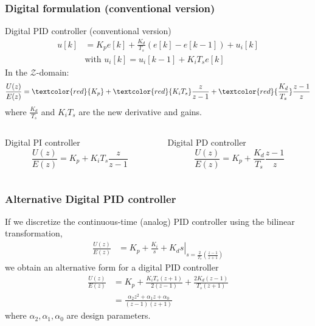 \begin{frame}
	\frametitle{Digital formulation (conventional version)}
	\vspace{-1em}
	\small{
	\begin{block}{Digital PID controller (conventional version)}
			\vspace{-1em}
			\begin{align*}
			u[k] &= K_p e[k] + \frac{K_d}{T_s}(e[k] - e[k-1])+u_i[k] \\
			&\text{with } u_i[k] = u_i[k-1] + K_i T_s e[k]
			\end{align*}	
			In the $\mathcal{Z}$-domain:
			\begin{equation*}
			\frac{U(z)}{E(z)} = \textcolor{red}{K_p}  + \textcolor{red}{K_i T_s}\frac{z}{z-1} + \textcolor{red}{\frac{K_d}{T_s}}\frac{z-1}{z}
			\end{equation*}
			where $\frac{K_d}{T_s}$ and $K_iT_s$  are the new derivative and gains.
	\end{block}
	\begin{columns}
		\begin{column}{0.5 \textwidth}
			\begin{block}{Digital PI controller}
				$$\frac{U(z)}{E(z)} = K_p + K_i T_s \frac{z}{z-1} $$
			\end{block}
		\end{column}
		\begin{column}{0.5 \textwidth}
			\begin{block}{Digital PD controller}
				$$\frac{U(z)}{E(z)} = K_p + \frac{K_d}{T_s}\frac{z-1}{z} $$
			\end{block}
		\end{column}
	\end{columns}}
\end{frame}

\begin{frame}
	\frametitle{Alternative Digital PID controller}
	If we discretize the continuous-time (analog) PID controller using the bilinear transformation,
	\begin{align*}
	\frac{U(z)}{E(z)} &= \left. K_p + \frac{K_i}{s} + K_d s \right|_ {s=\frac{2}{T_s}\left( \frac{z-1}{z+1}\right)}
	\end{align*}
	we obtain an alternative form for a digital PID controller
	\begin{align*}
		\frac{U(z)}{E(z)} &= K_p + \frac{K_iT_s(z + 1)}{2(z-1)} + \frac{2K_d(z-1)}{T_s(z+1)} \\
		&= \frac{\alpha_2 z^2 + \alpha_1 z + \alpha_0}{(z-1)(z+1)}
	\end{align*}
	where $\alpha_2, \alpha_1, \alpha_0$ are design parameters.
\end{frame}

